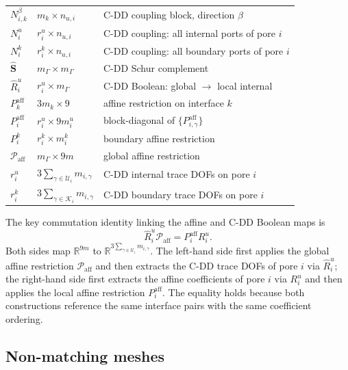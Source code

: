 \documentclass[11pt,a4paper]{article}
\newcommand{\R}{\mathbb{R}}
\newcommand{\Schur}{\mathbf{S}}
\begin{document}
\begin{table}[htbp]
\begin{tabular}{@{}lll@{}}
    \midrule
    $N_{i,k}^\beta$ & $m_k\times n_{u,i}$ & C-DD coupling block, direction $\beta$ \\
    $N_i^u$ & $r_i^u\times n_{u,i}$ & C-DD coupling: all internal ports of pore $i$ \\
    $N_i^k$ & $r_i^k\times n_{u,i}$ & C-DD coupling: all boundary ports of pore $i$ \\
    $\widehat{\Schur}$ & $m_\Gamma\times m_\Gamma$ & C-DD Schur complement \\
    $\widehat{R}_i^u$ & $r_i^u\times m_\Gamma$ & C-DD Boolean: global $\to$ local internal \\
    $P_k^{\text{aff}}$ & $3m_k\times 9$ & affine restriction on interface $k$ \\
    $P_i^{\text{aff}}$ & $r_i^u\times 9m_i^u$ & block-diagonal of $\{P_{i,\gamma}^{\text{aff}}\}$ \\
    $P_i^k$ & $r_i^k\times m_i^k$ & boundary affine restriction \\
    $\mathcal{P}_{\text{aff}}$ & $m_\Gamma\times 9m$ & global affine restriction \\
    \midrule
    $r_i^u$ & $3\sum_{\gamma\in\mathcal{U}_i} m_{i,\gamma}$ & C-DD internal trace DOFs on pore $i$ \\
    $r_i^k$ & $3\sum_{\gamma\in\mathcal{K}_i} m_{i,\gamma}$ & C-DD boundary trace DOFs on pore $i$ \\
    \bottomrule
  \end{tabular}
\end{table}

The key commutation identity linking the affine and C-DD Boolean maps is
\begin{equation}\label{eq:commutation}
  \widehat{R}_i^u \mathcal{P}_{\text{aff}}
  = P_i^{\text{aff}} R_i^u .
\end{equation}
Both sides map $\R^{9m}$ to
$\R^{3\sum_{\gamma\in\mathcal{U}_i}m_{i,\gamma}}$.
The left-hand side first applies the global affine restriction
$\mathcal{P}_{\text{aff}}$ and then extracts the C-DD trace DOFs of
pore $i$ via $\widehat{R}_i^u$; the right-hand side first extracts the
affine coefficients of pore $i$ via $R_i^u$ and then applies the local
affine restriction $P_i^{\text{aff}}$.  The equality holds because both
constructions reference the same interface pairs with the same
coefficient ordering.

\subsection{Non-matching meshes}
\end{document}
